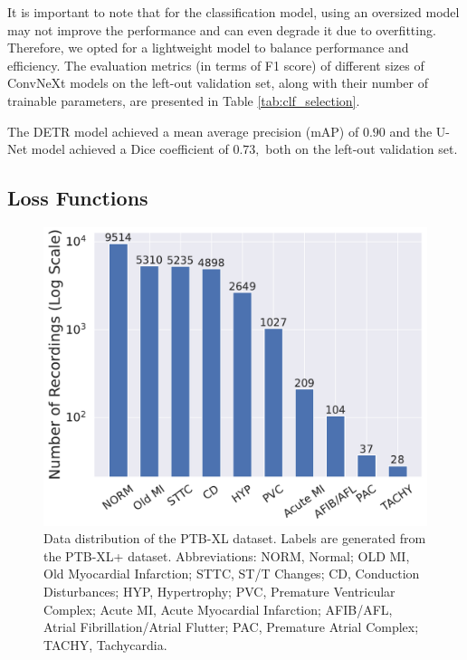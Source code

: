 

It is important to note that for the classification model, using an oversized model may not improve the performance and can even degrade it due to overfitting. Therefore, we opted for a lightweight model to balance performance and efficiency. The evaluation metrics (in terms of F1 score) of different sizes of ConvNeXt models on the left-out validation set, along with their number of trainable parameters, are presented in Table \ref{tab:clf_selection}.



The DETR model achieved a mean average precision (mAP) of $0.90$ and the U-Net model achieved a Dice coefficient of $0.73,$ both on the left-out validation set.

\subsection{Loss Functions}
\label{subsec:loss_functions}


\begin{figure}[!htp]
\centering
\includegraphics[width=\linewidth]{images/data_distribution.pdf}
\caption{Data distribution of the PTB-XL dataset. Labels are generated from the PTB-XL+ dataset. Abbreviations: NORM, Normal; OLD MI, Old Myocardial Infarction; STTC, ST/T Changes; CD, Conduction Disturbances; HYP, Hypertrophy; PVC, Premature Ventricular Complex; Acute MI, Acute Myocardial Infarction; AFIB/AFL, Atrial Fibrillation/Atrial Flutter; PAC, Premature Atrial Complex; TACHY, Tachycardia.}
\label{fig:data-distribution}
\end{figure}

